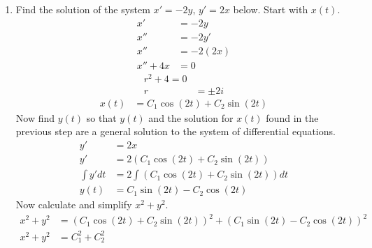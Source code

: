 \documentclass{article}
\begin{document}
\begin{enumerate}[label = \textbf{(\alph*)}]
	\item
		Find the solution of the system $ x' = -2y $, $ y' = 2x $ below. Start with $ x(t) $.
		\begin{align*}
			x' & = -2y \\
			x'' & = -2y' \\
			x'' & = -2(2x) \\
			x'' + 4x & = 0
		\end{align*}
		\begin{align*}
			r^2 + 4 = 0 \\
			r & = \pm 2i
		\end{align*}
		\begin{align*}
			x(t) & = C_1\cos(2t) + C_2\sin(2t)
		\end{align*}
		Now find $ y(t) $ so that $ y(t) $ and the solution for $ x(t) $ found in the previous step are a general solution to the system of differential equations.
		\begin{align*}
			y' & = 2x \\
			y' & = 2(C_1\cos(2t) + C_2\sin(2t)) \\
			\int y' dt & = 2 \int \left( C_1\cos(2t) + C_2\sin(2t) \right) dt \\
			y(t) & = C_1\sin(2t) - C_2\cos(2t)
		\end{align*}
		Now calculate and simplify $ x^2 + y^2 $.
		\begin{align*}
			x^2 + y^2 & = (C_1\cos(2t) + C_2\sin(2t))^2 + (C_1\sin(2t) - C_2\cos(2t))^2 \\
			x^2 + y^2 & = C_1^2 + C_2^2
		\end{align*}
\end{enumerate}
\end{document}
